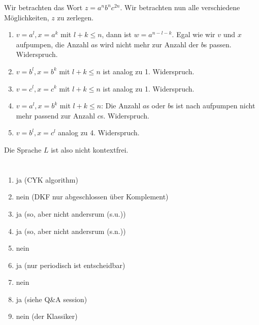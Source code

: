 \documentclass{article}
\begin{document}
Wir betrachten das Wort $z = a^nb^nc^{2n}$. Wir betrachten nun alle verschiedene Möglichkeiten, $z$ zu zerlegen.
\begin{enumerate}
	\item $v = a^l, x = a^k$ mit $l + k \leq n$, dann ist $w = a^{n-l-k}$. Egal wie wir $v$ und $x$ aufpumpen, die Anzahl $a$s wird nicht mehr zur Anzahl der $b$s passen. Widerspruch.
  \item $v = b^l, x = b^k$ mit $l + k \leq n$ ist analog zu 1. Widerspruch.
  \item $v = c^l, x = c^k$ mit $l + k \leq n$ ist analog zu 1. Widerspruch.
  \item $v = a^l, x = b^k$ mit $l + k \leq n$: Die Anzahl $a$s oder $b$s ist nach aufpumpen nicht mehr passend zur Anzahl $c$s. Widerspruch.
  \item $v = b^l, x = c^l$ analog zu 4. Widerspruch.
\end{enumerate}
Die Sprache $L$ ist also nicht kontextfrei.

\section{}%

\section{}%
\begin{enumerate}
	\item ja (CYK algorithm)
	\item nein (DKF nur abgeschlossen über Komplement)
	\item ja (so, aber nicht andersrum (s.u.))
	\item ja (so, aber nicht andersrum (s.n.))
	\item nein 
	\item ja (nur periodisch ist entscheidbar) 
	\item nein
	\item ja (siehe Q\&A session)
	\item nein (der Klassiker)
\end{enumerate}
\end{document}
